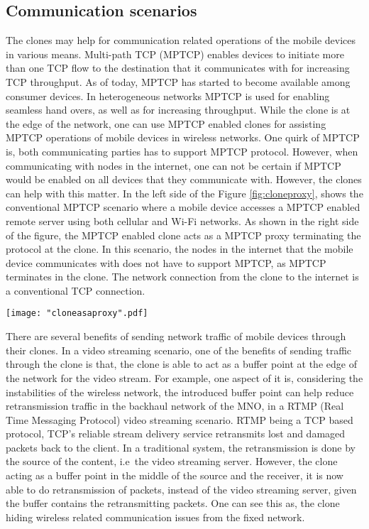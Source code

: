 \documentclass[12pt,journal,compsoc, onecolumn]{IEEEtran}
\begin{document}
\subsection{Communication scenarios}

The clones may help for communication related operations of the mobile devices in various means. Multi-path TCP (MPTCP) enables devices to initiate more than one TCP flow to the destination that it communicates with for increasing TCP throughput. As of today, MPTCP has started to become available among consumer devices. In heterogeneous networks MPTCP is used for enabling seamless hand overs, as well as for increasing throughput. While the clone is at the edge of the network, one can use MPTCP enabled clones for assisting MPTCP operations of mobile devices in wireless networks. One quirk of MPTCP is, both communicating parties has to support MPTCP protocol. However, when communicating with nodes in the internet, one can not be certain if MPTCP would be enabled on all devices that they communicate with. However, the clones can help with this matter. In the left side of the Figure \ref{fig:cloneproxy}, shows the conventional MPTCP scenario where a mobile device accesses a MPTCP enabled remote server using both cellular and Wi-Fi networks. As shown in the right side of the figure, the MPTCP enabled clone acts as a MPTCP proxy terminating the protocol at the clone. In this scenario, the nodes in the internet that the mobile device communicates with does not have to support MPTCP, as MPTCP terminates in the clone. The network connection from the clone to the internet is a conventional TCP connection.


\begin{figure*}[ht]
\centering
\texttt{[image: "cloneasaproxy".pdf]}
\caption{\label{fig:cloneproxy} Clone as a MTCP proxy for seamless service delivery}
\end{figure*} 

There are several benefits of sending network traffic of mobile devices through their clones. In a video streaming scenario, one of the benefits of sending traffic through the clone is that, the clone is able to act as a buffer point at the edge of the network for the video stream. For example, one aspect of it is, considering the instabilities of the wireless network, the introduced buffer point can help reduce retransmission traffic in the backhaul network of the MNO, in a RTMP (Real Time Messaging Protocol) video streaming scenario. RTMP being a TCP based protocol, TCP's reliable stream delivery service retransmits lost and damaged packets back to the client. In a traditional system, the retransmission is done by the source of the content, i.e\ the video streaming server. However, the clone acting as a buffer point in the middle of the source and the receiver, it is now able to do retransmission of packets, instead of the video streaming server, given the buffer contains the retransmitting packets. One can see this as, the clone hiding wireless related communication issues from the fixed network.
\end{document}
